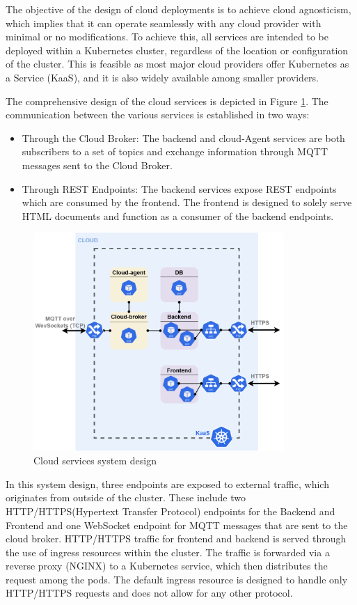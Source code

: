 The objective of the design of cloud deployments is to achieve cloud agnosticism, which implies that it can operate seamlessly with any cloud provider with minimal or no modifications. To achieve this, all services are intended to be deployed within a Kubernetes cluster, regardless of the location or configuration of the cluster. This is feasible as most major cloud providers offer Kubernetes as a Service (KaaS), and it is also widely available among smaller providers.

The comprehensive design of the cloud services is depicted in Figure \ref{fig:cloud_services}. The communication between the various services is established in two ways:
\begin{itemize}
    \item Through the Cloud Broker: The backend and cloud-Agent services are both subscribers to a set of topics and exchange information through MQTT messages sent to the Cloud Broker.
    \item Through REST Endpoints: The backend services expose REST endpoints which are consumed by the frontend. The frontend is designed to solely serve HTML documents and function as a consumer of the backend endpoints.
\end{itemize}

\begin{figure}[H]
    \centering
    \includegraphics[width=0.85\textwidth]{pictures/cloud_services.png}
    \caption{Cloud services system design}
    \label{fig:cloud_services}
\end{figure}

In this system design, three endpoints are exposed to external traffic, which originates from outside of the cluster. These include two HTTP/HTTPS(Hypertext Transfer Protocol) endpoints for the Backend and Frontend and one WebSocket endpoint for MQTT messages that are sent to the cloud broker. HTTP/HTTPS traffic for frontend and backend is served through the use of ingress resources within the cluster. The traffic is forwarded via a reverse proxy (NGINX) to a Kubernetes service, which then distributes the request among the pods. The default ingress resource is designed to handle only HTTP/HTTPS requests and does not allow for any other protocol.

